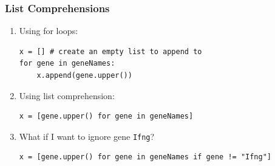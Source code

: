 \documentclass[pdf]{beamer}
\begin{document}
\begin{frame}[fragile]
\frametitle{List Comprehensions}

\begin{enumerate}
\item<1-> Using for loops:
\begin{lstlisting}[style=python]
x = [] # create an empty list to append to
for gene in geneNames:
    x.append(gene.upper())
\end{lstlisting}

\item<2-> Using list comprehension:
\begin{lstlisting}[style=python]
x = [gene.upper() for gene in geneNames]
\end{lstlisting}

\item<3-> What if I want to ignore gene \texttt{Ifng}?
\begin{lstlisting}[style=python]
x = [gene.upper() for gene in geneNames if gene != "Ifng"]
\end{lstlisting}

\end{enumerate}

\end{frame}
\end{document}
